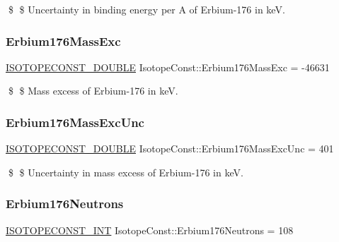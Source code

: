 \$ \$ Uncertainty in binding energy per A of Erbium-\/176 in keV. \mbox{\label{group___isotope_const-_erbium-_er176_ga6c698635efff420b68c8bf02c81626c7}} 
\subsubsection{\texorpdfstring{Erbium176\+Mass\+Exc}{Erbium176MassExc}}
{\footnotesize\ttfamily \mbox{\hyperlink{group___isotope_const-_macros_ga8f45a7272ce02c0b4c65c44636ed719a}{I\+S\+O\+T\+O\+P\+E\+C\+O\+N\+S\+T\+\_\+\+D\+O\+U\+B\+LE}} Isotope\+Const\+::\+Erbium176\+Mass\+Exc = -\/46631}

\$ \$ Mass excess of Erbium-\/176 in keV. \mbox{\label{group___isotope_const-_erbium-_er176_gaddfaf233016a377c319145491fecde59}} 
\subsubsection{\texorpdfstring{Erbium176\+Mass\+Exc\+Unc}{Erbium176MassExcUnc}}
{\footnotesize\ttfamily \mbox{\hyperlink{group___isotope_const-_macros_ga8f45a7272ce02c0b4c65c44636ed719a}{I\+S\+O\+T\+O\+P\+E\+C\+O\+N\+S\+T\+\_\+\+D\+O\+U\+B\+LE}} Isotope\+Const\+::\+Erbium176\+Mass\+Exc\+Unc = 401}

\$ \$ Uncertainty in mass excess of Erbium-\/176 in keV. \mbox{\label{group___isotope_const-_erbium-_er176_ga3053d7d86d938b7e62745fbff5ecd4bb}} 
\subsubsection{\texorpdfstring{Erbium176\+Neutrons}{Erbium176Neutrons}}
{\footnotesize\ttfamily \mbox{\hyperlink{group___isotope_const-_macros_ga5f18360b3e99483a35c32d789e62621c}{I\+S\+O\+T\+O\+P\+E\+C\+O\+N\+S\+T\+\_\+\+I\+NT}} Isotope\+Const\+::\+Erbium176\+Neutrons = 108}

